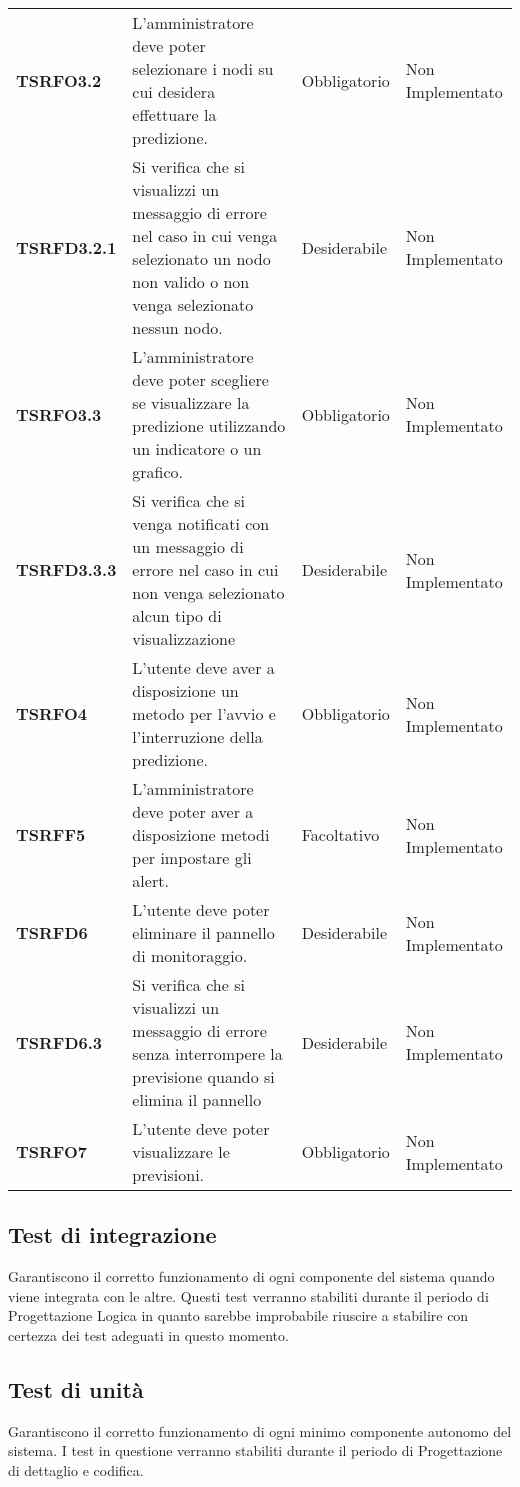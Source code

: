 \documentclass[../piano-di-qualifica.tex]{subfiles}
\begin{document}
\begin{longtable}[H]{>{\centering\bfseries}m{2cm} >{\centering}m{9cm} >{\centering}m{2.5cm} >{\centering\arraybackslash}m{2.5cm}}
  \textbf{TSRFO3.2} & L’amministratore deve poter selezionare i nodi su cui desidera effettuare la predizione. & Obbligatorio & Non Implementato \\
  \textbf{TSRFD3.2.1} & Si verifica che si visualizzi un messaggio di errore nel caso in cui venga selezionato un nodo non valido o non venga selezionato nessun nodo. & Desiderabile & Non Implementato \\

  \textbf{TSRFO3.3} & L’amministratore deve poter scegliere se visualizzare la predizione utilizzando un indicatore o un grafico. & Obbligatorio & Non Implementato \\

  \textbf{TSRFD3.3.3} & Si verifica che si venga notificati con un messaggio di errore nel caso in cui non venga selezionato alcun tipo di visualizzazione & Desiderabile & Non Implementato \\
  
  \textbf{TSRFO4} & L'utente deve aver a disposizione un metodo per l’avvio e l’interruzione della predizione. & Obbligatorio & Non Implementato \\

  \textbf{TSRFF5} & L'amministratore deve poter aver a disposizione metodi per impostare gli alert. & Facoltativo & Non Implementato \\
  
  \textbf{TSRFD6} & L'utente deve poter eliminare il pannello di monitoraggio. & Desiderabile & Non Implementato \\
  \textbf{TSRFD6.3} & Si verifica che si visualizzi un messaggio di errore senza interrompere la previsione quando si elimina il pannello & Desiderabile & Non Implementato \\
  
  \textbf{TSRFO7} & L’utente deve poter visualizzare le previsioni. & Obbligatorio & Non Implementato \\


\end{longtable}

\subsection{Test di integrazione}
\label{sub:test_di_integrazione}
Garantiscono il corretto funzionamento di ogni componente del sistema quando viene integrata con le altre.
Questi test verranno stabiliti durante il periodo di Progettazione Logica in quanto sarebbe improbabile riuscire a stabilire con certezza dei test adeguati in questo momento.

\subsection{Test di unità}
\label{sub:test_di_unita}
Garantiscono il corretto funzionamento di ogni minimo componente autonomo del sistema.
I test in questione verranno stabiliti durante il periodo di Progettazione di dettaglio e codifica.
\end{document}
